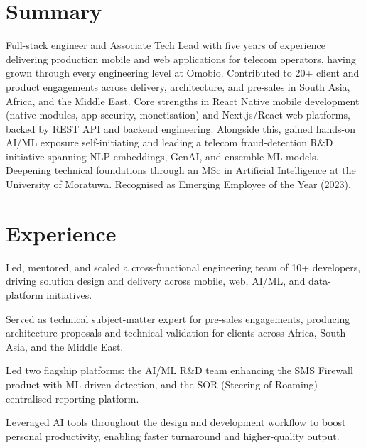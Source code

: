 \documentclass[10.5pt]{article}
\begin{document}

\section*{Summary}
Full-stack engineer and Associate Tech Lead with five years of experience delivering production mobile and web applications for telecom operators, having grown through every engineering level at Omobio. Contributed to 20+ client and product engagements across delivery, architecture, and pre-sales in South Asia, Africa, and the Middle East. Core strengths in React Native mobile development (native modules, app security, monetisation) and Next.js/React web platforms, backed by REST API and backend engineering. Alongside this, gained hands-on AI/ML exposure self-initiating and leading a telecom fraud-detection R\&D initiative spanning NLP embeddings, GenAI, and ensemble ML models. Deepening technical foundations through an MSc in Artificial Intelligence at the University of Moratuwa. Recognised as Emerging Employee of the Year (2023).

\section*{Experience}

\begin{cvitems}
  \item Led, mentored, and scaled a cross-functional engineering team of 10+ developers, driving solution design and delivery across mobile, web, AI/ML, and data-platform initiatives.
  \item Served as technical subject-matter expert for pre-sales engagements, producing architecture proposals and technical validation for clients across Africa, South Asia, and the Middle East.
  \item Led two flagship platforms: the AI/ML R\&D team enhancing the SMS Firewall product with ML-driven detection, and the SOR (Steering of Roaming) centralised reporting platform.
  \item Leveraged AI tools throughout the design and development workflow to boost personal productivity, enabling faster turnaround and higher-quality output.
\end{cvitems}
\end{document}
